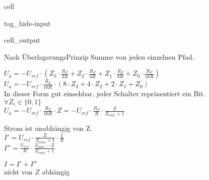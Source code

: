 \documentclass[letterpaper,10pt,english]{jupyterBook}
\begin{document}
\begin{sphinxuseclass}{cell}
\begin{sphinxuseclass}{tag_hide-input}\begin{sphinxVerbatimOutput}

\begin{sphinxuseclass}{cell_output}
\noindent{}

\end{sphinxuseclass}\end{sphinxVerbatimOutput}

\end{sphinxuseclass}
\end{sphinxuseclass}
\begin{DUlineblock}{0em}
\item[] 
\end{DUlineblock}

\sphinxAtStartPar
Nach Überlagerungs\sphinxhyphen{}Prinzip Summe von jeden einzelnen Pfad.

\sphinxAtStartPar
\(U_a = -U_{ref}\cdot \left(Z_3\cdot\frac{R_F}{2R} + Z_2\cdot\frac{R_F}{4R} + Z_1\cdot\frac{R_F}{8R} + Z_0\cdot\frac{R_F}{16R}\right)\)\\
\(U_a = -U_{ref} \cdot \frac{R_F}{16R}\cdot (8\cdot Z_3 + 4\cdot Z_2 + 2 \cdot Z_1 + Z_0)\)\\
In dieser Form gut einsehbar, jeder Schalter repräsentiert ein Bit.\\
\(\forall Z_i \in \{0, 1\}\)\\
\(U_a = -U_{ref} \cdot\frac{R_F}{16R}\cdot Z = -U_{ref}\cdot\frac{R_F}{R}\cdot \frac{Z}{Z_{max}  +1}\)

\sphinxAtStartPar
Strom ist unabhängig von Z.\\
\(I'  = U_{ref} \cdot \frac{Z}{Z_{max} + 1}\cdot \frac{1}{R}\)\\
\(I'' = \frac{U_{ref}}{R}\cdot \frac{Z_{max} - Z}{Z_{max} + 1}\)

\sphinxAtStartPar
\(I = I' + I''\)\\
nicht von \(Z\) abhängig

\begin{DUlineblock}{0em}
\item[] 
\end{DUlineblock}
\end{document}
